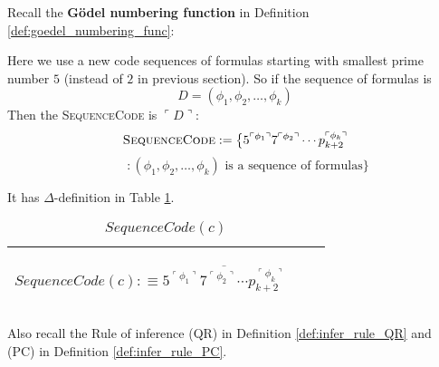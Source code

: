 \documentclass[11pt,letterpaper]{book}
\theoremstyle{definition}
\begin{document}
Recall the \textbf{G\"odel numbering function} in Definition \ref{def:goedel_numbering_func}:

\goedelfunc*

Here we use a new code sequences of formulas starting with smallest prime number $5$ (instead of $2$ in previous section). So if the sequence of formulas is 
$$ D = (\phi_1, \phi_2, \ldots, \phi_k )$$
Then the \textsc{SequenceCode} is $\ulcorner D \urcorner$:
$$\text{\textsc{SequenceCode}}  := \big\{  5^{ \ulcorner \phi_1 \urcorner } 7^{\ulcorner \phi_2 \urcorner  } \cdots p_{k+2} ^{\ulcorner \phi_k \urcorner  } $$ $$ \quad \quad : (\phi_1, \phi_2, \ldots, \phi_k) \text{ is a sequence of formulas} \big\}    $$

It has $\Delta$-definition in Table \ref{table:sequence_code}.


\begin{table}[ht!]
\caption{$SequenceCode (c)$}
\label{table:sequence_code}
\begin{tabular}{|p{0.9\linewidth}|}
\hline
\rule{0pt}{3ex}
\begin{center}
$SequenceCode (c) : \equiv \overline{5^{ \ulcorner \phi_1 \urcorner } 7^{\ulcorner \phi_2 \urcorner  } \cdots p_{k+2} ^{\ulcorner \phi_k \urcorner  }} $
\end{center}\\
\hline
\end{tabular}
\end{table}


Also recall the Rule of inference (QR) in Definition \ref{def:infer_rule_QR} and (PC) in Definition \ref{def:infer_rule_PC}.
\end{document}
